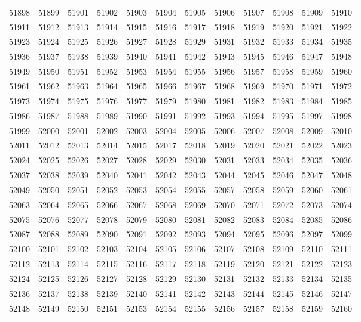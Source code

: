 \begin{center}
\begin{longtable}{llllllllllll}
51898 &51899 &51901 &51902 &51903 &51904 &51905 &51906 &51907 &51908 &51909 &51910 \\
51911 &51912 &51913 &51914 &51915 &51916 &51917 &51918 &51919 &51920 &51921 &51922 \\
51923 &51924 &51925 &51926 &51927 &51928 &51929 &51931 &51932 &51933 &51934 &51935 \\
51936 &51937 &51938 &51939 &51940 &51941 &51942 &51943 &51945 &51946 &51947 &51948 \\
51949 &51950 &51951 &51952 &51953 &51954 &51955 &51956 &51957 &51958 &51959 &51960 \\
51961 &51962 &51963 &51964 &51965 &51966 &51967 &51968 &51969 &51970 &51971 &51972 \\
51973 &51974 &51975 &51976 &51977 &51979 &51980 &51981 &51982 &51983 &51984 &51985 \\
51986 &51987 &51988 &51989 &51990 &51991 &51992 &51993 &51994 &51995 &51997 &51998 \\
51999 &52000 &52001 &52002 &52003 &52004 &52005 &52006 &52007 &52008 &52009 &52010 \\
52011 &52012 &52013 &52014 &52015 &52017 &52018 &52019 &52020 &52021 &52022 &52023 \\
52024 &52025 &52026 &52027 &52028 &52029 &52030 &52031 &52033 &52034 &52035 &52036 \\
52037 &52038 &52039 &52040 &52041 &52042 &52043 &52044 &52045 &52046 &52047 &52048 \\
52049 &52050 &52051 &52052 &52053 &52054 &52055 &52057 &52058 &52059 &52060 &52061 \\
52063 &52064 &52065 &52066 &52067 &52068 &52069 &52070 &52071 &52072 &52073 &52074 \\
52075 &52076 &52077 &52078 &52079 &52080 &52081 &52082 &52083 &52084 &52085 &52086 \\
52087 &52088 &52089 &52090 &52091 &52092 &52093 &52094 &52095 &52096 &52097 &52099 \\
52100 &52101 &52102 &52103 &52104 &52105 &52106 &52107 &52108 &52109 &52110 &52111 \\
52112 &52113 &52114 &52115 &52116 &52117 &52118 &52119 &52120 &52121 &52122 &52123 \\
52124 &52125 &52126 &52127 &52128 &52129 &52130 &52131 &52132 &52133 &52134 &52135 \\
52136 &52137 &52138 &52139 &52140 &52141 &52142 &52143 &52144 &52145 &52146 &52147 \\
52148 &52149 &52150 &52151 &52153 &52154 &52155 &52156 &52157 &52158 &52159 &52160 \\

\end{longtable}
\end{center}
